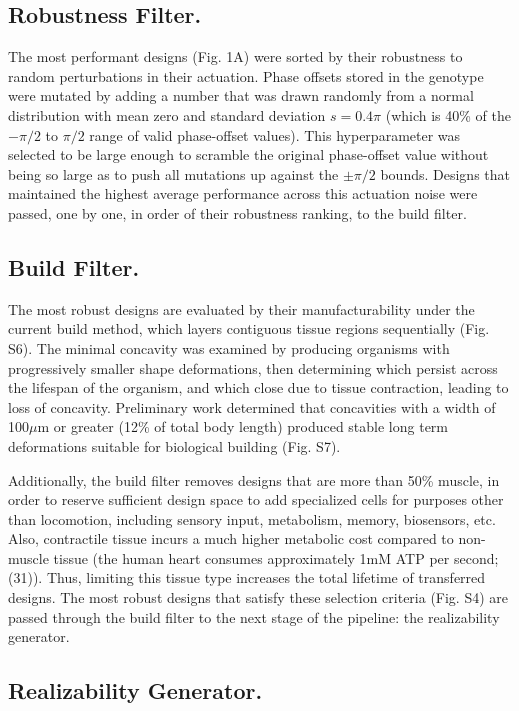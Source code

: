 \subsection*{Robustness Filter.}

The most performant designs (Fig. 1A) were sorted by their robustness to random perturbations in their actuation. Phase offsets stored in the genotype were mutated by adding a number that was drawn randomly from a normal distribution with mean zero and standard deviation $s = 0.4\pi$ (which is 40\% of the $-\pi/2$ to $\pi/2$ range of valid phase-offset values). This hyperparameter was selected to be large enough to scramble the original phase-offset value without being so large as to push all mutations up against the $\pm\pi/2$ bounds. Designs that maintained the highest average performance across this actuation noise were passed, one by one, in order of their robustness ranking, to the build filter.

\subsection*{Build Filter.}

The most robust designs are evaluated by their manufacturability under the current build method, which layers contiguous tissue regions sequentially (Fig. S6). The minimal concavity was examined by producing organisms with progressively smaller shape deformations, then determining which persist across the lifespan of the organism, and which close due to tissue contraction, leading to loss of concavity. Preliminary work determined that concavities with a width of 100{$\mu$}m or greater (12\% of total body length) produced stable long term deformations suitable for biological building (Fig. S7). 

Additionally, the build filter removes designs that are more than 50\% muscle, in order to reserve sufficient design space to add specialized cells for purposes other than locomotion, including sensory input, metabolism, memory, biosensors, etc. Also, contractile tissue incurs a much higher metabolic cost compared to non-muscle tissue (the human heart consumes approximately 1mM ATP per second; (31)). Thus, limiting this tissue type increases the total lifetime of transferred designs. The most robust designs that satisfy these selection criteria (Fig. S4) are passed through the build filter to the next stage of the pipeline: the realizability generator.

\subsection*{Realizability Generator.}


